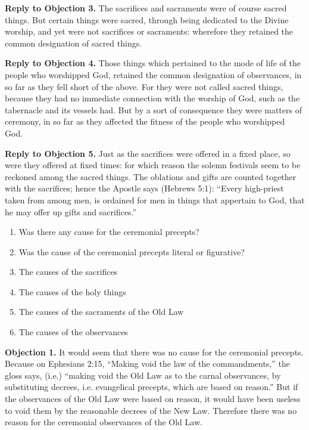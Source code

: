 \textbf{Reply to Objection 3.} The sacrifices and sacraments were of course sacred things. But certain things were sacred, through being dedicated to the Divine worship, and yet were not sacrifices or sacraments: wherefore they retained the common designation of sacred things.

\textbf{Reply to Objection 4.} Those things which pertained to the mode of life of the people who worshipped God, retained the common designation of observances, in so far as they fell short of the above. For they were not called sacred things, because they had no immediate connection with the worship of God, such as the tabernacle and its vessels had. But by a sort of consequence they were matters of ceremony, in so far as they affected the fitness of the people who worshipped God.

\textbf{Reply to Objection 5.} Just as the sacrifices were offered in a fixed place, so were they offered at fixed times: for which reason the solemn festivals seem to be reckoned among the sacred things. The oblations and gifts are counted together with the sacrifices; hence the Apostle says (Hebrews 5:1): ``Every high-priest taken from among men, is ordained for men in things that appertain to God, that he may offer up gifts and sacrifices.''


\begin{enumerate}

\item  Was there any cause for the ceremonial precepts? 
\item  Was the cause of the ceremonial precepts literal or figurative? 
\item  The causes of the sacrifices 
\item  The causes of the holy things 
\item  The causes of the sacraments of the Old Law 
\item  The causes of the observances 
\end{enumerate}


\textbf{Objection 1.} It would seem that there was no cause for the ceremonial precepts. Because on Ephesians 2:15, ``Making void the law of the commandments,'' the gloss says, (i.e.) ``making void the Old Law as to the carnal observances, by substituting decrees, i.e. evangelical precepts, which are based on reason.'' But if the observances of the Old Law were based on reason, it would have been useless to void them by the reasonable decrees of the New Law. Therefore there was no reason for the ceremonial observances of the Old Law.


